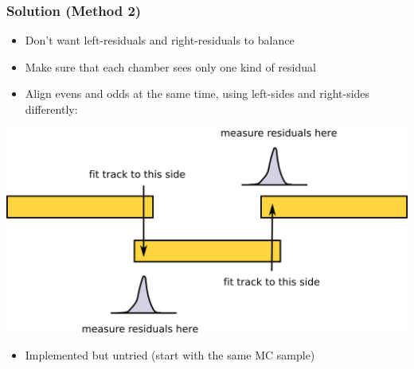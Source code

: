\documentclass[compress]{beamer}
\begin{document}
\begin{frame}
\frametitle{Solution (Method 2)}

\begin{itemize}
\item Don't want left-residuals and right-residuals to balance
\item Make sure that each chamber sees only one kind of residual
\item Align evens and odds at the same time, using left-sides and right-sides differently:
\end{itemize}
\begin{center}
\includegraphics[width=0.7\linewidth]{fit_to_both.png}
\end{center}

\begin{itemize}
\item Implemented but untried (start with the same MC sample)
\end{itemize}
\end{frame}
\end{document}
